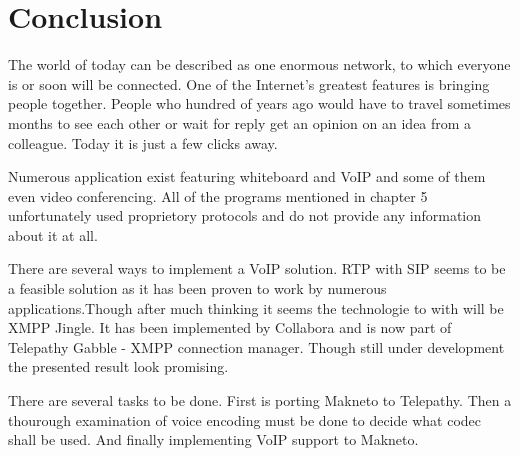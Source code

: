 % 




\chapter{Conclusion}
The world of today can be described as one enormous network, to which everyone is or soon will be connected. One of the Internet's greatest features is bringing people together. People who hundred of years ago would have to travel sometimes months to see each other or wait for reply get an opinion on an idea from a colleague. Today it is just a few clicks away.

Numerous application exist featuring whiteboard and VoIP and some of them even video conferencing. All of the programs mentioned in chapter 5 unfortunately used proprietory protocols and do not provide any information about it at all. 

There are several ways to implement a VoIP solution. RTP with SIP seems to be a feasible solution as it has been proven to work by numerous applications.Though after much thinking it seems the technologie to with will be XMPP Jingle. It has been implemented by Collabora and is now part of Telepathy Gabble - XMPP connection manager. Though still under development the presented result look promising.

There are several tasks to be done. First is porting Makneto to Telepathy. Then a thourough examination of voice encoding must be done to decide what codec shall be used. And finally implementing VoIP support to Makneto.   


